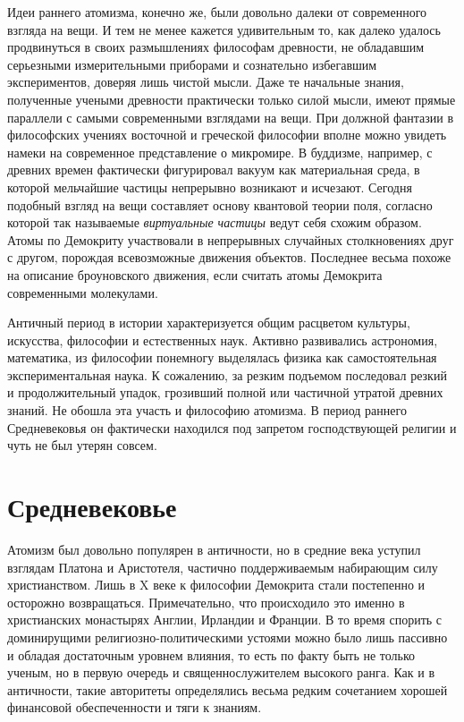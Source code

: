 Идеи раннего атомизма, конечно же, были довольно далеки от современного взгляда на вещи.
И тем не менее кажется удивительным то, как далеко удалось продвинуться в своих размышлениях философам древности, не обладавшим серьезными измерительными приборами и сознательно избегавшим экспериментов, доверяя лишь чистой мысли.
Даже те начальные знания, полученные учеными древности практически только силой мысли, имеют прямые параллели с самыми современными взглядами на вещи.
При должной фантазии в философских учениях восточной и греческой философии вполне можно увидеть намеки на современное представление о микромире.
В буддизме, например, с древних времен фактически фигурировал вакуум как материальная среда, в которой мельчайшие частицы непрерывно возникают и исчезают. 
Сегодня подобный взгляд на вещи составляет основу квантовой теории поля, согласно которой так называемые \textit{виртуальные частицы} ведут себя схожим образом. 
Атомы по Демокриту участвовали в непрерывных случайных столкновениях друг с другом, порождая всевозможные движения объектов. 
Последнее весьма похоже на описание броуновского движения, если считать атомы Демокрита современными молекулами.

Античный период в истории характеризуется общим расцветом культуры, искусства, философии и естественных наук.
Активно развивались астрономия, математика, из философии понемногу выделялась физика как самостоятельная экспериментальная наука.
К сожалению, за резким подъемом последовал резкий и продолжительный упадок, грозивший полной или частичной утратой древних знаний.
Не обошла эта участь и философию атомизма.
В период раннего Средневековья он фактически находился под запретом господствующей религии и чуть не был утерян совсем.


\section*{Средневековье}

Атомизм был довольно популярен в античности, но в средние века уступил взглядам Платона и Аристотеля, частично поддерживаемым набирающим силу христианством.
Лишь в X веке к философии Демокрита стали постепенно и осторожно возвращаться.
Примечательно, что происходило это именно в христианских монастырях Англии, Ирландии и Франции.
В то время спорить с доминирущими религиозно-политическими устоями можно было лишь пассивно и обладая достаточным уровнем влияния, то есть по факту быть не только ученым, но в первую очередь и священнослужителем высокого ранга.
Как и в античности, такие авторитеты определялись весьма редким сочетанием хорошей финансовой обеспеченности и тяги к знаниям.

